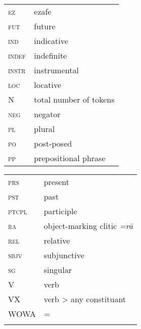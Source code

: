 \documentclass[output=paper,colorlinks,citecolor=brown,draftmode]{langscibook}
\begin{document}
\begin{tabularx}{.45\textwidth}{@{}lQ@{}}
\textsc{ez} & ezafe \\
\textsc{fut} & future \\
\textsc{ind} & indicative \\
\textsc{indef} & indefinite \\
\textsc{instr} & instrumental \\
\textsc{loc} & {locative} \\
N & total number of tokens \\
\textsc{neg} & negator \\
\textsc{pl} & plural \\
\textsc{po} & post-posed \\
\textsc{pp} & prepositional phrase \\
\end{tabularx}%
\begin{tabularx}{.45\textwidth}{@{}lQ@{}}
\textsc{prs} & present \\
\textsc{pst} & past \\
\textsc{ptcpl} & participle \\
\textsc{ra} & object-marking {clitic} \textit{=rā}\\
\textsc{rel} & relative \\
\textsc{sbjv} & subjunctive \\
\textsc{sg} & singular \\
\textsc{V} & {verb} \\
\textsc{VX} & {verb} > any constituant \\
WOWA & = \citet{Haig.Stilo.Dogan.Schiborr2022} \\
\\
\end{tabularx}

\sloppy
\printbibliography[heading=subbibliography,notkeyword=this]
\cleardoublepage
\end{document}
